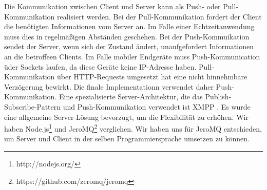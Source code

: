 Die Kommunikation zwischen Client und Server kann als Push- oder Pull-Kommunikation realisiert werden. 
Bei der Pull-Kommunikation fordert der Client die benötigten Informationen vom Server an. Im Falle einer Echtzeitanwendung muss dies in regelmäßigen Abständen geschehen.
Bei der Push-Kommuikation sendet der Server, wenn sich der Zustand ändert, unaufgefordert Informationen an die betroffeen Clients.
Im Falle mobiler Endgeräte muss Push-Kommunication üder Sockets laufen, da diese Geräte keine IP-Adresse haben.
Pull-Kommunikation über HTTP-Requests umgesetzt hat eine nicht hinnehmbare Verzögerung bewirkt.
Die finale Implementationn verwendet daher Push-Kommunikation. Eine spezialisierte Server-Architektur, die das Publish-Subscribe-Pattern und Push-Kommunikation verwendet ist XMPP \cite{XMPP}. Es wurde eine allgemeine Server-Lösung bevorzugt, um die Flexibilität zu erhöhen. Wir haben Node.js\footnote{http://nodejs.org/} und JeroMQ\footnote{https://github.com/zeromq/jeromq} verglichen. Wir haben uns für JeroMQ entschieden, um Server und Client in der selben Programmiersprache umsetzen zu können.
